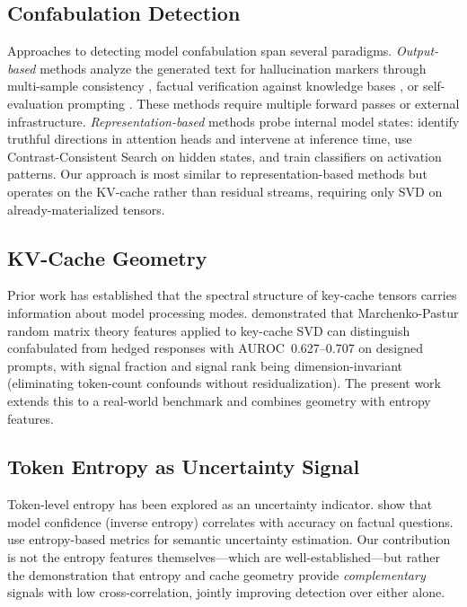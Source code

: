 \documentclass[11pt,a4paper]{article}
\begin{document}
\subsection{Confabulation Detection}

Approaches to detecting model confabulation span several paradigms. \emph{Output-based} methods analyze the generated text for hallucination markers through multi-sample consistency \citep{manakul2023selfcheckgpt}, factual verification against knowledge bases \citep{min2023factscore}, or self-evaluation prompting \citep{kadavath2022language}. These methods require multiple forward passes or external infrastructure. \emph{Representation-based} methods probe internal model states: \citet{li2023inference} identify truthful directions in attention heads and intervene at inference time, \citet{burns2023discovering} use Contrast-Consistent Search on hidden states, and \citet{azaria2023internal} train classifiers on activation patterns. Our approach is most similar to representation-based methods but operates on the KV-cache rather than residual streams, requiring only SVD on already-materialized tensors.

\subsection{KV-Cache Geometry}

Prior work has established that the spectral structure of key-cache tensors carries information about model processing modes. \citet{edrington2026detecting} demonstrated that Marchenko-Pastur random matrix theory features applied to key-cache SVD can distinguish confabulated from hedged responses with AUROC~0.627--0.707 on designed prompts, with signal fraction and signal rank being dimension-invariant (eliminating token-count confounds without residualization). The present work extends this to a real-world benchmark and combines geometry with entropy features.

\subsection{Token Entropy as Uncertainty Signal}

Token-level entropy has been explored as an uncertainty indicator. \citet{kadavath2022language} show that model confidence (inverse entropy) correlates with accuracy on factual questions. \citet{kuhn2023semantic} use entropy-based metrics for semantic uncertainty estimation. Our contribution is not the entropy features themselves---which are well-established---but rather the demonstration that entropy and cache geometry provide \emph{complementary} signals with low cross-correlation, jointly improving detection over either alone.
\end{document}
